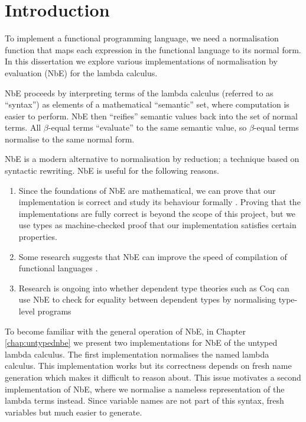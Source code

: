 \chapter{Introduction}
\label{chap:introduction}

To implement a functional programming language, we need a normalisation function that maps each expression in the functional language to its normal form.
In this dissertation we explore various implementations of normalisation by evaluation (NbE) for the lambda calculus.

NbE proceeds by interpreting terms of the lambda calculus (referred to as “syntax”) as elements of a mathematical “semantic” set, where computation is easier to perform. NbE then “reifies” semantic values back into the set of normal terms. All $\beta$-equal terms “evaluate” to the same semantic value, so $\beta$-equal terms normalise to the same normal form.

NbE is a modern alternative to normalisation by reduction; a technique based on syntactic rewriting. NbE is useful for the following reasons.

\begin{enumerate}
    \item Since the foundations of NbE are mathematical, we can prove that our implementation is correct and study its behaviour formally \cite{AgdaNbe}. Proving that the implementations are fully correct is beyond the scope of this project, but we use types as machine-checked proof that our implementation satisfies certain properties.
    \item Some research suggests that NbE can improve the speed of compilation of functional languages \cite{efficientNbE}.
    \item Research is ongoing into whether dependent type theories such as Coq can use NbE to check for equality between dependent types by normalising type-level programs 
\end{enumerate}

To become familiar with the general operation of NbE, in Chapter \ref{chap:untypednbe} we present two implementations for NbE of the untyped lambda calculus. The first implementation normalises the named lambda calculus. This implementation works but its correctness depends on fresh name generation which makes it difficult to reason about. This issue motivates a second implementation of NbE, where we normalise a nameless representation of the lambda terms instead. Since variable names are not part of this syntax, fresh variables but much easier to generate.

